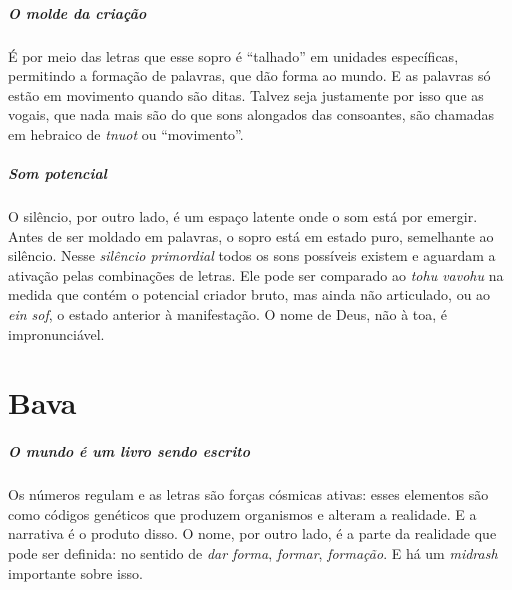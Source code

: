 \paragraph{O molde da criação} É por meio das letras que esse sopro é ``talhado'' em unidades específicas, permitindo a formação de palavras, que dão forma ao mundo. E as palavras só estão em movimento quando são ditas. Talvez seja justamente por isso que as vogais, que nada mais são do que sons alongados das consoantes, são chamadas em hebraico de \textit{tnuot} ou ``movimento''.

\paragraph{Som potencial} O silêncio, por outro lado, é um espaço latente onde o som está por emergir. Antes de ser moldado em palavras, o sopro está em estado puro, semelhante ao silêncio. Nesse \textit{silêncio primordial} todos os sons possíveis existem e aguardam a ativação pelas combinações de letras. Ele pode ser comparado ao \textit{tohu vavohu} na medida que contém o potencial criador bruto, mas ainda não articulado, ou ao \textit{ein sof}, o estado anterior à manifestação. O nome de Deus, não à toa, é impronunciável.

\chapter*{Bava \smallskip{}}

\begin{center}
{\huge{}}
\end{center}

\paragraph{O mundo é um livro sendo escrito} Os números regulam e as letras são forças cósmicas ativas: esses elementos são como códigos genéticos que produzem organismos e alteram a realidade. E a narrativa é o produto disso. O nome, por outro lado, é a parte da realidade que pode ser definida: no sentido de \textit{dar forma}, \textit{formar}, \textit{formação}. E há um \textit{midrash} importante sobre isso.

